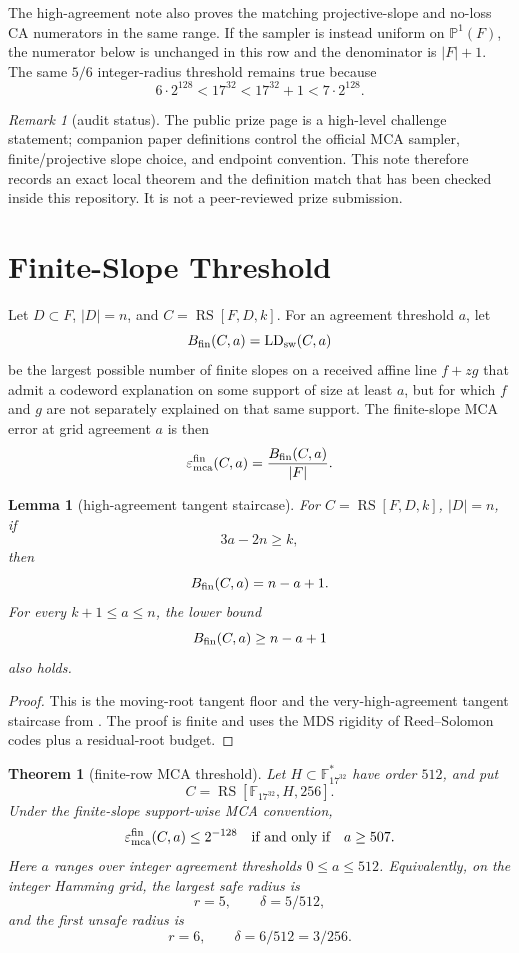 \documentclass[11pt]{article}
\newtheorem{theorem}{Theorem}
\newtheorem{lemma}{Lemma}
\theoremstyle{remark}
\newtheorem{remark}{Remark}
\newcommand{\F}{\mathbb F}
\newcommand{\PP}{\mathbb P}
\newcommand{\RS}{\operatorname{RS}}
\newcommand{\LD}{\operatorname{LD}}
\newcommand{\eps}{\varepsilon}
\begin{document}
The high-agreement note also proves the matching projective-slope and no-loss CA
numerators in the same range.  If the sampler is instead uniform on
\(\PP^1(F)\), the numerator below is unchanged in this row and the denominator is
\(|F|+1\).  The same \(5/6\) integer-radius threshold remains true because
\[
  6\cdot 2^{128}<17^{32}<17^{32}+1<7\cdot2^{128}.
\]

\begin{remark}[audit status]
The public prize page is a high-level challenge statement; companion paper
definitions control the official MCA sampler, finite/projective slope choice,
and endpoint convention.  This note therefore records an exact local theorem
and the definition match that has been checked inside this repository.  It is
not a peer-reviewed prize submission.
\end{remark}

\section{Finite-Slope Threshold}
\label{sec:threshold}

Let \(D\subset F\), \(|D|=n\), and \(C=\RS[F,D,k]\).  For an agreement threshold
\(a\), let
\[
  B_{\rm fin}(C,a)=\LD_{\rm sw}(C,a)
\]
be the largest possible number of finite slopes on a received affine line
\(f+zg\) that admit a codeword explanation on some support of size at least
\(a\), but for which \(f\) and \(g\) are not separately explained on that same
support.  The finite-slope MCA error at grid agreement \(a\) is then
\[
  \eps_{\rm mca}^{\rm fin}(C,a)=\frac{B_{\rm fin}(C,a)}{|F|}.
\]

\begin{lemma}[high-agreement tangent staircase]
\label{lem:tangent-staircase}
For \(C=\RS[F,D,k]\), \(|D|=n\), if
\[
  3a-2n\ge k,
\]
then
\[
  B_{\rm fin}(C,a)=n-a+1.
\]
For every \(k+1\le a\le n\), the lower bound
\[
  B_{\rm fin}(C,a)\ge n-a+1
\]
also holds.
\end{lemma}

\begin{proof}
This is the moving-root tangent floor and the very-high-agreement tangent
staircase from .
The proof is finite and uses the MDS rigidity of Reed--Solomon codes plus a
residual-root budget.
\end{proof}

\begin{theorem}[finite-row MCA threshold]
\label{thm:f17-threshold}
Let \(H\subset\F_{17^{32}}^*\) have order \(512\), and put
\[
  C=\RS[\F_{17^{32}},H,256].
\]
Under the finite-slope support-wise MCA convention,
\[
  \eps_{\rm mca}^{\rm fin}(C,a)\le 2^{-128}
  \quad\text{if and only if}\quad
  a\ge507.
\]
Here \(a\) ranges over integer agreement thresholds \(0\le a\le512\).
Equivalently, on the integer Hamming grid, the largest safe radius is
\[
  r=5,\qquad \delta=5/512,
\]
and the first unsafe radius is
\[
  r=6,\qquad \delta=6/512=3/256.
\]
\end{theorem}
\end{document}
